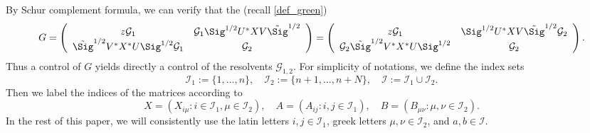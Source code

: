 By Schur complement formula, we can verify that the (recall \eqref{def_green})
\begin{align} 
G = \left( {\begin{array}{*{20}c}
   { z\mathcal G_1} & \mathcal G_1 \Sig^{1/2} U^{*}X V\tilde \Sig^{1/2}  \\
   {\tilde\Sig^{1/2}V^*X^* U\Sig^{1/2} \mathcal G_1} & { \mathcal G_2 }  \\
\end{array}} \right) = \left( {\begin{array}{*{20}c}
   { z\mathcal G_1} & \Sig^{1/2} U^{*}X V\tilde \Sig^{1/2} \mathcal G_2   \\
   {\mathcal G_2}\tilde\Sig^{1/2}V^*X^* U\Sig^{1/2} & { \mathcal G_2 }  \\ 
\end{array}} \right). \label{green2}
\end{align}
Thus a control of $G$ yields directly a control of the resolvents $\mathcal G_{1,2}$. For simplicity of notations, we define the index sets
\[\mathcal I_1:=\{1,...,n\}, \quad \mathcal I_2:=\{n+1,...,n+N\}, \quad \mathcal I:=\mathcal I_1\cup\mathcal I_2.\]
Then we label the indices of the matrices according to 
$$X= (X_{i\mu}:i\in \mathcal I_1, \mu \in \mathcal I_2), \quad A=(A_{ij}: i,j\in \mathcal I_1),\quad B=(B_{\mu\nu}: \mu,\nu\in \mathcal I_2).$$  
In the rest of this paper, %
we will consistently use the latin letters $i,j\in\mathcal I_1$, greek letters $\mu,\nu\in\mathcal I_2$, and $a,b\in\mathcal I$. 

